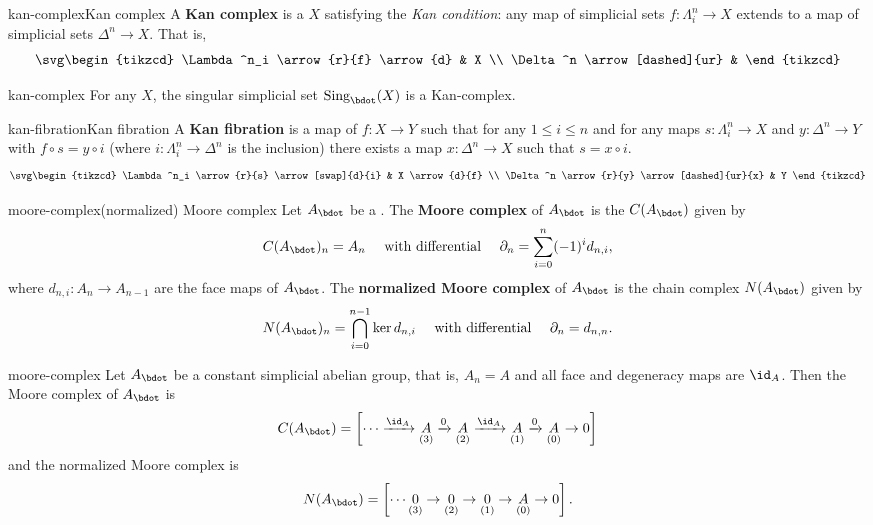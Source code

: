 \begin{topic}{kan-complex}{Kan complex}
    A \textbf{Kan complex} is a  $X$ satisfying the \textit{Kan condition}: any map of simplicial sets $f : \Lambda^n_i \to X$ extends to a map of simplicial sets $\Delta^n \to X$. That is,
    \[ \svg \begin{tikzcd} \Lambda^n_i \arrow{r}{f} \arrow{d} & X \\ \Delta^n \arrow[dashed]{ur} & \end{tikzcd} \]
\end{topic}

\begin{example}{kan-complex}
    For any  $X$, the singular simplicial set $\textup{Sing}_\bdot(X)$ is a Kan-complex.
\end{example}

\begin{topic}{kan-fibration}{Kan fibration}
    A \textbf{Kan fibration} is a map of  $f : X \to Y$ such that for any $1 \le i \le n$ and for any maps $s : \Lambda^n_i \to X$ and $y : \Delta^n \to Y$ with $f \circ s = y \circ i$ (where $i : \Lambda^n_i \to \Delta^n$ is the inclusion) there exists a map $x : \Delta^n \to X$ such that $s = x \circ i$.
    \[ \svg \begin{tikzcd} \Lambda^n_i \arrow{r}{s} \arrow[swap]{d}{i} & X \arrow{d}{f} \\ \Delta^n \arrow{r}{y} \arrow[dashed]{ur}{x} & Y \end{tikzcd} \]
\end{topic}

\begin{topic}{moore-complex}{(normalized) Moore complex}
    Let $A_\bdot$ be a  . The \textbf{Moore complex} of $A_\bdot$ is the  $C(A_\bdot)$ given by
    \[ C(A_\bdot)_n = A_n \quad \textup{ with differential } \quad \partial_n = \sum_{i = 0}^{n} (-1)^i d_{n, i} , \]
    where $d_{n, i} : A_n \to A_{n - 1}$ are the face maps of $A_\bdot$. The \textbf{normalized Moore complex} of $A_\bdot$ is the chain complex $N(A_\bdot)$ given by
    \[ N(A_\bdot)_n = \bigcap_{i = 0}^{n - 1} \ker d_{n, i} \quad \text{ with differential } \quad \partial_n = d_{n, n} . \]
\end{topic}

\begin{example}{moore-complex}
    Let $A_\bdot$ be a constant simplicial abelian group, that is, $A_n = A$ and all face and degeneracy maps are $\id_A$. Then the Moore complex of $A_\bdot$ is
    \[ C(A_\bdot) = \left[ \cdots \xrightarrow{\id_A} \underset{(3)}{A} \xrightarrow{0} \underset{(2)}{A} \xrightarrow{\id_A} \underset{(1)}{A} \xrightarrow{0} \underset{(0)}{A} \to 0 \right] \]
    and the normalized Moore complex is
    \[ N(A_\bdot) = \left[ \cdots \underset{(3)}{0} \to \underset{(2)}{0} \to \underset{(1)}{0} \to \underset{(0)}{A} \to 0 \right] . \]
\end{example}

